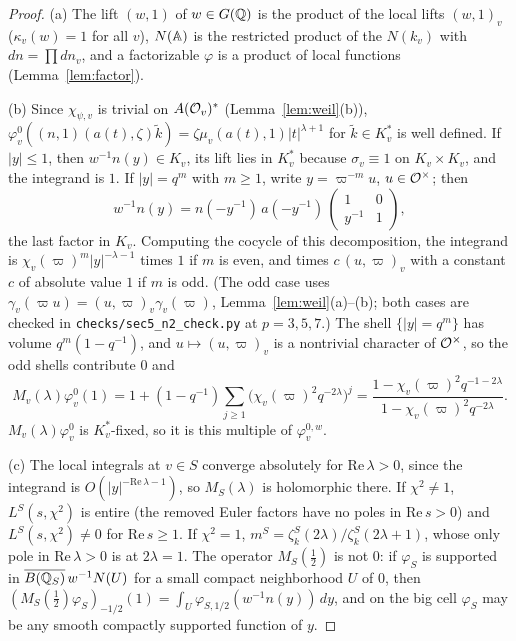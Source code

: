 \begin{proof}
(a) The lift $(w,1)$ of $w\in G(\mathbb{Q})$ is the product of the local lifts
$(w,1)_v$ ($\kappa_v(w)=1$ for all $v$), $N(\mathbb{A})$ is the restricted
product of the $N(k_v)$ with $dn=\prod dn_v$, and a factorizable
$\varphi$ is a product of local functions (Lemma~\ref{lem:factor}).

(b) Since $\chi_{\psi,v}$ is trivial on $A(\mathcal{O}_v)^*$
(Lemma~\ref{lem:weil}(b)), $\varphi_v^0((n,1)(a(t),\zeta)\tilde k)=\zeta
\mu_v(a(t),1)|t|^{\lambda+1}$ for $\tilde k\in K_v^*$ is well defined. If
$|y|\le1$, then $w^{-1}n(y)\in K_v$, its lift lies in $K_v^*$ because
$\sigma_v\equiv1$ on $K_v\times K_v$, and the integrand is $1$. If
$|y|=q^m$ with $m\ge1$, write $y=\varpi^{-m}u$, $u\in\mathcal{O}^\times$; then
\[
w^{-1}n(y)=n(-y^{-1})\,a(-y^{-1})\,\begin{pmatrix}1&0\\y^{-1}&1
\end{pmatrix},
\]
the last factor in $K_v$. Computing the cocycle of this decomposition, the
integrand is $\chi_v(\varpi)^m|y|^{-\lambda-1}$ times $1$ if $m$ is even,
and times $c\,(u,\varpi)_v$ with a constant $c$ of absolute value $1$ if
$m$ is odd. (The odd case uses $\gamma_v(\varpi u)=(u,\varpi)_v
\gamma_v(\varpi)$, Lemma~\ref{lem:weil}(a)--(b); both cases are checked in
\texttt{checks/sec5\_n2\_check.py} at $p=3,5,7$.) The shell
$\{|y|=q^m\}$ has volume $q^m(1-q^{-1})$, and $u\mapsto(u,\varpi)_v$ is a
nontrivial character of $\mathcal{O}^\times$, so the odd shells contribute $0$
and
\[
M_v(\lambda)\varphi_v^0(1)=1+(1-q^{-1})\sum_{j\ge1}\bigl(\chi_v(\varpi)^2
q^{-2\lambda}\bigr)^j=\frac{1-\chi_v(\varpi)^2q^{-1-2\lambda}}
{1-\chi_v(\varpi)^2q^{-2\lambda}} .
\]
$M_v(\lambda)\varphi_v^0$ is $K_v^*$-fixed, so it is this multiple of
$\varphi_v^{0,w}$.

(c) The local integrals at $v\in S$ converge absolutely for
$\mathrm{Re}\,\lambda>0$, since the integrand is $O(|y|^{-\mathrm{Re}\,
\lambda-1})$, so $M_S(\lambda)$ is holomorphic there. If $\chi^2\ne1$,
$L^S(s,\chi^2)$ is entire (the removed Euler factors have no poles in
$\mathrm{Re}\,s>0$) and $L^S(s,\chi^2)\ne0$ for $\mathrm{Re}\,s\ge1$.
If $\chi^2=1$, $m^S=\zeta_k^S(2\lambda)/\zeta_k^S(2\lambda+1)$, whose only
pole in $\mathrm{Re}\,\lambda>0$ is at $2\lambda=1$. The operator
$M_S(\frac12)$ is not $0$: if $\varphi_S$ is supported in
$\overline{B(\mathbb{Q}_S)}\,w^{-1}N(U)$ for a small compact neighborhood $U$ of
$0$, then $(M_S(\frac12)\varphi_S)_{-1/2}(1)=\int_U\varphi_{S,1/2}
(w^{-1}n(y))\,dy$, and on the big cell $\varphi_S$ may be any smooth
compactly supported function of $y$.
\end{proof}

